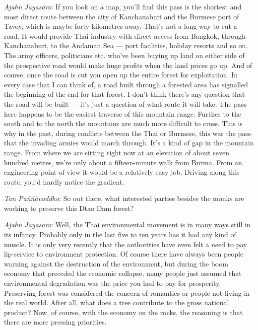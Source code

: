 \emph{Ajahn Jayasāro‎}: If you look on a map, you'll find this pass is
the shortest and most direct route between the city of Kanchanaburi and
the Burmese port of Tavoy, which is maybe forty kilometres away. That's
not a long way to cut a road. It would provide Thai industry with direct
access from Bangkok, through Kanchanaburi, to the Andaman Sea --- port
facilities, holiday resorts and so on. The army officers, politicians
etc. who've been buying up land on either side of the prospective road
would make huge profits when the land prices go up. And of course, once
the road is cut you open up the entire forest for exploitation. In every
case that I can think of, a road built through a forested area has
signalled the beginning of the end for that forest. I don't think
there's any question that the road will be built --- it's just a
question of what route it will take. The pass here happens to be the
easiest traverse of this mountain range. Further to the south and to the
north the mountains are much more difficult to cross. This is why in the
past, during conflicts between the Thai or Burmese, this was the pass
that the invading armies would march through. It's a kind of gap in the
mountain range. From where we are sitting right now at an elevation of
about seven hundred metres, we're only about a fifteen-minute walk from
Burma. From an engineering point of view it would be a relatively easy
job. Driving along this route, you'd hardly notice the gradient.

\emph{Tan Paññāvuddho}‎: So out there, what interested parties besides
the monks are working to preserve this Dtao Dam forest?

\emph{Ajahn Jayasāro‎}: Well, the Thai environmental movement is in many
ways still in its infancy. Probably only in the last five to ten years
has it had any kind of muscle. It is only very recently that the
authorities have even felt a need to pay lip-service to environment
protection. Of course there have always been people warning against the
destruction of the environment, but during the boom economy that
preceded the economic collapse, many people just assumed that
environmental degradation was the price you had to pay for prosperity.
Preserving forest was considered the concern of romantics or people not
living in the real world. After all, what does a tree contribute to the
gross national product? Now, of course, with the economy on the rocks,
the reasoning is that there are more pressing priorities.

